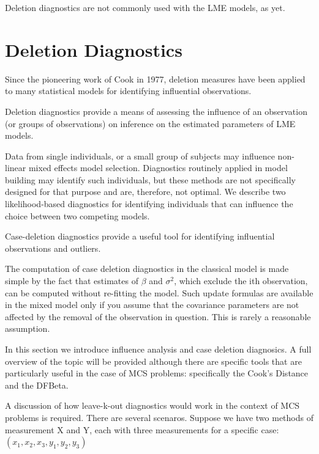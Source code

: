 \documentclass[12pt, a4paper]{report}
\theoremstyle{plain}
\theoremstyle{definition}
\theoremstyle{remark}
\begin{document}
	Deletion diagnostics are not commonly used with the LME models, as
	yet.
	
	
	
\section{Deletion Diagnostics}

Since the pioneering work of Cook in 1977, deletion measures have been applied to many statistical models for identifying influential observations.

Deletion diagnostics provide a means of assessing the influence of an observation (or groups of observations) on inference on the estimated parameters of LME models.

Data from single individuals, or a small group of subjects may influence non-linear mixed effects model selection. Diagnostics routinely applied in model building may identify such individuals, but these methods are not specifically designed for that purpose and are, therefore, not optimal. We describe two likelihood-based diagnostics for identifying individuals that can influence the choice between two competing models.

Case-deletion diagnostics provide a useful tool for identifying influential observations and outliers.

The computation of case deletion diagnostics in the classical model is made simple by the fact that estimates of $\beta$ and $\sigma^2$, which exclude the ith observation, can be computed without re-fitting the model. Such update formulas are available in the mixed model only if you assume that the covariance parameters are not affected by the removal of the observation in question. This is rarely a reasonable assumption.

In this section we introduce influence analysis and case deletion diagnosics. A full overview of the topic will be provided although there are specific tools that are particularly useful in the case of MCS problems: specifically the Cook's Distance and the DFBeta.

A discussion of how leave-k-out diagnostics would work in the context of MCS problems is required. There are several scenaros. Suppose we have two methods of measurement X and Y, each with three measurements for a specific case: $(x_1,x_2,x_3,y_1,y_2,y_3)$
\end{document}
